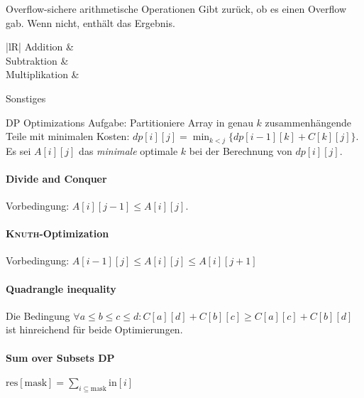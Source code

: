 \begin{algorithm}{Overflow-sichere arithmetische Operationen}
	Gibt zurück, ob es einen Overflow gab. Wenn nicht, enthält  das Ergebnis.
	\begin{expandtable}
	\begin{tabularx}{\linewidth}{|lR|}
		\hline
		Addition &  \\
		Subtraktion &  \\
		Multiplikation &  \\
		\hline
	\end{tabularx}
	\end{expandtable}
\end{algorithm}

\begin{algorithm}{Sonstiges}
\end{algorithm}

\begin{algorithm}{DP Optimizations}
	Aufgabe: Partitioniere Array in genau $k$ zusammenhängende Teile mit minimalen Kosten:
	$dp[i][j] = \min_{k<j}\{dp[i-1][k]+C[k][j]\}$. Es sei $A[i][j]$ das \emph{minimale} optimale
	$k$ bei der Berechnung von $dp[i][j]$.
	
	\paragraph{Divide and Conquer}
	Vorbedingung: $A[i][j - 1] \leq A[i][j]$.
	
	
	\paragraph{\textsc{Knuth}-Optimization} Vorbedingung: $A[i - 1][j] \leq A[i][j] \leq A[i][j + 1]$
	
	
	\paragraph{Quadrangle inequality} Die Bedingung  $\forall a\leq b\leq c\leq d:
	C[a][d] + C[b][c] \geq C[a][c] + C[b][d]$ ist hinreichend für beide Optimierungen.
	
	\paragraph{Sum over Subsets DP} $\text{res}[\text{mask}]=\sum_{i\subseteq\text{mask}}\text{in}[i]$
\end{algorithm}

